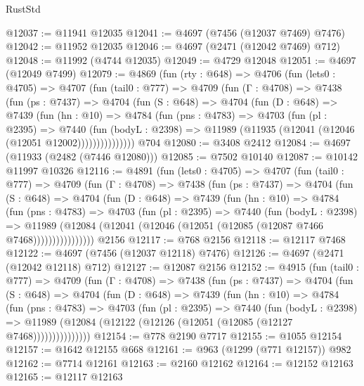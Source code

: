 \begin{lexlean}{RustStd}
\begin{coremodule}
@12037 := @11941 @12035
@12041 := @4697 (@7456 (@12037 @7469) @7476)
@12042 := @11952 @12035
@12046 := @4697 (@2471 (@12042 @7469) @712)
@12048 := @11992 (@4744 @12035)
@12049 := @4729 @12048
@12051 := @4697 (@12049 @7499)
@12079 := @4869
    (fun (rty : @648) =>
    @4706
      (fun (lets0 : @4705) =>
      @4707
        (fun (tail0 : @777) =>
        @4709
          (fun (Γ : @4708) =>
          @7438
            (fun (ps : @7437) =>
            @4704
              (fun (S : @648) =>
              @4704
                (fun (D : @648) =>
                @7439
                  (fun (hn : @10) =>
                  @4784
                    (fun (pns : @4783) =>
                    @4703
                      (fun (pl : @2395) =>
                      @7440
                        (fun (bodyL : @2398) =>
                        @11989 (@11935 (@12041 (@12046 (@12051 @12002)))))))))))))))
    @704
@12080 := @3408 @2412
@12084 := @4697 (@11933 (@2482 (@7446 @12080)))
@12085 := @7502 @10140
@12087 := @10142 @11997 @10326
@12116 := @4891
    (fun (lets0 : @4705) =>
    @4707
      (fun (tail0 : @777) =>
      @4709
        (fun (Γ : @4708) =>
        @7438
          (fun (ps : @7437) =>
          @4704
            (fun (S : @648) =>
            @4704
              (fun (D : @648) =>
              @7439
                (fun (hn : @10) =>
                @4784
                  (fun (pns : @4783) =>
                  @4703
                    (fun (pl : @2395) =>
                    @7440
                      (fun (bodyL : @2398) =>
                      @11989
                        (@12084 (@12041 (@12046 (@12051 (@12085 (@12087 @7466 @7468))))))))))))))))
    @2156
@12117 := @768 @2156
@12118 := @12117 @7468
@12122 := @4697 (@7456 (@12037 @12118) @7476)
@12126 := @4697 (@2471 (@12042 @12118) @712)
@12127 := @12087 @2156
@12152 := @4915
    (fun (tail0 : @777) =>
    @4709
      (fun (Γ : @4708) =>
      @7438
        (fun (ps : @7437) =>
        @4704
          (fun (S : @648) =>
          @4704
            (fun (D : @648) =>
            @7439
              (fun (hn : @10) =>
              @4784
                (fun (pns : @4783) =>
                @4703
                  (fun (pl : @2395) =>
                  @7440
                    (fun (bodyL : @2398) =>
                    @11989 (@12084 (@12122 (@12126 (@12051 (@12085 (@12127 @7468)))))))))))))))
@12154 := @778 @2190 @7717
@12155 := @1055 @12154
@12157 := @1642 @12155 @668
@12161 := @963 (@1299 (@771 @12157)) @982
@12162 := @7714 @12161
@12163 := @2160 @12162
@12164 := @12152 @12163
@12165 := @12117 @12163

\end{coremodule}
\end{lexlean}
